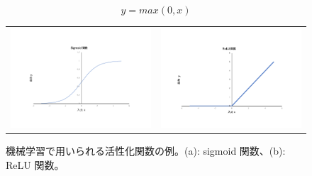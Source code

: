 \begin{equation}
    y = max(0,x)
    \label{equ:ReLU}
\end{equation}

\begin{figure}
    \begin{tabular}{cc}
    \begin{minipage}[b]{0.45\hsize}
        \includegraphics[clip, width=7cm]{fig/4/sigmoid_2.pdf}
        \subcaption{}
        \label{fig:sigmoid}
    \end{minipage}&
    \begin{minipage}[b]{0.45\hsize}
        \includegraphics[clip, width=7cm]{fig/4/ReLU_2.pdf}
        \subcaption{}
        \label{fig:ReLU}
    \end{minipage}
    \end{tabular}
    \caption{機械学習で用いられる活性化関数の例。(a): sigmoid 関数、(b): ReLU 関数。}
    \label{fig:acctivation}
\end{figure}

